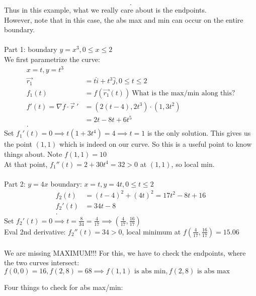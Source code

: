 \begin{itemize}
\begin{example}
\[			.\] 
		Thus in this example, what we really care about is the endpoints.\\
		However, note that in this case, the abs max and min can occur on the entire boundary.\\
		\\
		Part 1: boundary $y = x^3, 0 \le  x\le 2$\\
		We first parametrize the curve:
		\begin{align*}
			x = t, y = t^3\\
			\vec{r_1} &=  t\hat{i} + t^3\hat{j}, 0 \le  t \le  2 \\
			f_1(t) &= f\left( \vec{r_1}\left( t \right)  \right) ~ \text{What is the max/min along this?}\\
			f'(t) = \nabla f \cdot  \vec{r} ~ ' &= \left( 2\left( t-4 \right) , 2t^3 \right) \cdot \left( 1, 3t^2 \right) \\
												&= 2t-8t+6t^5\\
		.\end{align*}
		Set $f_1'(t) = 0 \implies t\left( 1+3t^4 \right)  = 4 \implies t = 1$ is the only solution. This gives us the point $(1,1)$ which is indeed on our curve. So this is a useful point to know things about. Note $f(1,1) = 10$\\
		At that point,  $f_1''(t) = 2 + 30t^4 = 32 > 0$ at $(1,1)$, so local min.\\
		\\
		Part 2: $ y = 4x$ boundary: $x = t, y = 4t, 0 \le  t \le  2$
		\begin{align*}
			f_2(t) &= \left( t-4 \right) ^2 + \left( 4t \right) ^2 = 17t^2 - 8t + 16\\
			f_2'(t) &=  34t-8 \\
		.\end{align*}
		Set $f_2'(t) = 0\implies t = \frac{8}{34} = \frac{4}{17}\implies \left( \frac{4}{17}, \frac{16}{17} \right) $ \\
		Eval 2nd derivative: $f_2''(t) = 34 > 0$, local minimum at $f\left( \frac{4}{17}, \frac{16}{17}  \right) = 15.06$ 
		\\
		\\
		We are missing MAXIMUM!!! For this, we have to check the endpoints, where the two curves intersect:\\
		$f(0,0) = 16, f(2,8) = 68 \implies f(1,1) \text{ is abs min}, f(2,8) \text{ is abs max}$
		\end{example}
		\begin{idea}
			Four things to check for abs max/min:\\

\end{idea}
\end{itemize}
